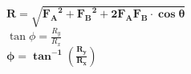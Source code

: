 \documentclass[12pt]{ipu-mechanics}
\begin{document}
    \parbox{\textwidth}{\centering
        $\boxed{\bm{R = \sqrt{{F_A}^2 + {F_B}^2 + 2 F_A F_B\cdot\cos\theta}}}$
        \\[10pt]
        $\tan\phi = \frac{R_y}{R_x}$
        \\[10pt]
        $\boxed{\bm{\phi = \tan^{-1}\left(\frac{R_y}{R_x}\right)}}$
    }
\end{document}
